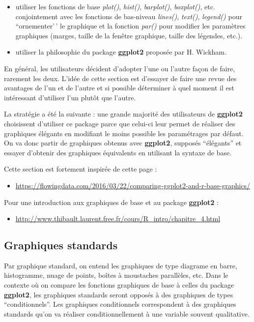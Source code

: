 \documentclass[
]{book}
\providecommand{\tightlist}{%
  \setlength{\itemsep}{0pt}\setlength{\parskip}{0pt}}
\theoremstyle{definition}
\theoremstyle{definition}
\theoremstyle{definition}
\theoremstyle{definition}
\theoremstyle{remark}
\begin{document}
\begin{itemize}
\item
  utiliser les fonctions de base \emph{plot()}, \emph{hist()}, \emph{barplot()}, \emph{boxplot()}, etc. conjointement avec les fonctions de bas-niveau \emph{lines()}, \emph{text()}, \emph{legend()} pour ``ornementer'\,' le graphique et la fonction \emph{par()} pour modifier les paramètres graphiques (marges, taille de la fenêtre graphique, taille des légendes, etc.).
\item
  utiliser la philosophie du package \textbf{ggplot2} proposée par H. Wickham.
\end{itemize}

En général, les utilisateurs décident d'adopter l'une ou l'autre façon de faire, rarement les deux. L'idée de cette section est d'essayer de faire une revue des avantages de l'un et de l'autre et si possible déterminer à quel moment il est intéressant d'utiliser l'un plutôt que l'autre.

La stratégie a été la suivante : une grande majorité des utilisateurs de \textbf{ggplot2} choisissent d'utiliser ce package parce que celui-ci leur permet de réaliser des graphiques élégants en modifiant le moins possible les paramétrages par défaut. On va donc partir de graphiques obtenus avec \textbf{ggplot2}, supposés ``élégants'' et essayer d'obtenir des graphiques équivalents en utilisant la syntaxe de base.

Cette section est fortement inspirée de cette page :

\begin{itemize}
\tightlist
\item
  \url{https://flowingdata.com/2016/03/22/comparing-ggplot2-and-r-base-graphics/}
\end{itemize}

Pour une introduction aux graphiques de base et au package \textbf{ggplot2} :

\begin{itemize}
\tightlist
\item
  \url{http://www.thibault.laurent.free.fr/cours/R_intro/chapitre_4.html}
\end{itemize}

\hypertarget{graphiques-standards}{%
\subsection{Graphiques standards}\label{graphiques-standards}}

Par graphique standard, on entend les graphiques de type diagrame en barre, histogramme, nuage de points, boîtes à moustaches parallèles, etc. Dans le contexte où on compare les fonctions graphiques de base à celles du package \textbf{ggplot2}, les graphiques standards seront opposés à des graphiques de types ``conditionnels''. Les graphiques conditionnels correspondent à des graphiques standards qu'on va réaliser conditionnellement à une variable souvent qualitative.
\end{document}
